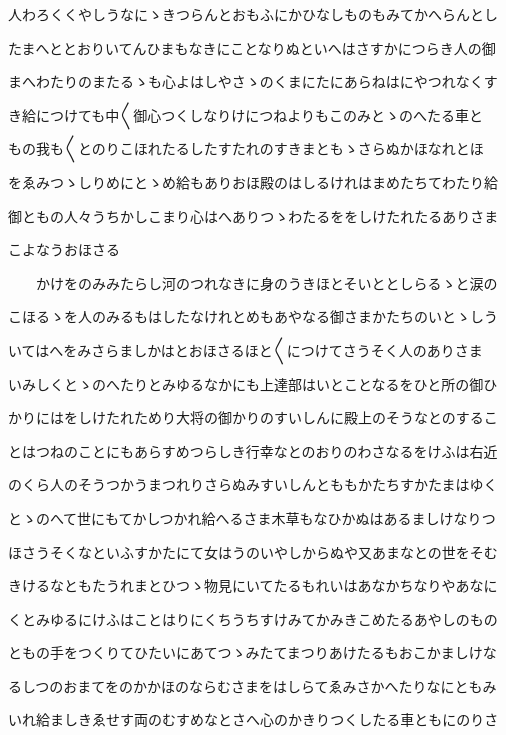 \documentclass[a4paper,11pt,landscape]{ltjtarticle}
\begin{document}
\par\medskip
人わろくくやしうなにゝきつらんとおもふにかひなしものもみてかへらんとし
\par\medskip
たまへととおりいてんひまもなきにことなりぬといへはさすかにつらき人の御
\par\medskip
まへわたりのまたるゝも心よはしやさゝのくまにたにあらねはにやつれなくす
\par\medskip
き給につけても中〱御心つくしなりけにつねよりもこのみとゝのへたる車と
\par\medskip
もの我も〱とのりこほれたるしたすたれのすきまともゝさらぬかほなれとほ
\par\medskip
をゑみつゝしりめにとゝめ給もありおほ殿のはしるけれはまめたちてわたり給
\par\medskip
御ともの人々うちかしこまり心はへありつゝわたるををしけたれたるありさま
\par\medskip
こよなうおほさる
\par\medskip
　　かけをのみみたらし河のつれなきに身のうきほとそいととしらるゝと涙の
\par\medskip
こほるゝを人のみるもはしたなけれとめもあやなる御さまかたちのいとゝしう
\par\medskip
いてはへをみさらましかはとおほさるほと〱につけてさうそく人のありさま
\par\medskip
いみしくとゝのへたりとみゆるなかにも上達部はいとことなるをひと所の御ひ
\par\medskip
かりにはをしけたれためり大将の御かりのすいしんに殿上のそうなとのするこ
\par\medskip
とはつねのことにもあらすめつらしき行幸なとのおりのわさなるをけふは右近
\par\medskip
のくら人のそうつかうまつれりさらぬみすいしんとももかたちすかたまはゆく
\par\medskip
とゝのへて世にもてかしつかれ給へるさま木草もなひかぬはあるましけなりつ
\par\medskip
ほさうそくなといふすかたにて女はうのいやしからぬや又あまなとの世をそむ
\par\medskip
きけるなともたうれまとひつゝ物見にいてたるもれいはあなかちなりやあなに
\par\medskip
くとみゆるにけふはことはりにくちうちすけみてかみきこめたるあやしのもの
\par\medskip
ともの手をつくりてひたいにあてつゝみたてまつりあけたるもおこかましけな
\par\medskip
るしつのおまてをのかかほのならむさまをはしらてゑみさかへたりなにともみ
\par\medskip
いれ給ましきゑせす両のむすめなとさへ心のかきりつくしたる車ともにのりさ
\end{document}
